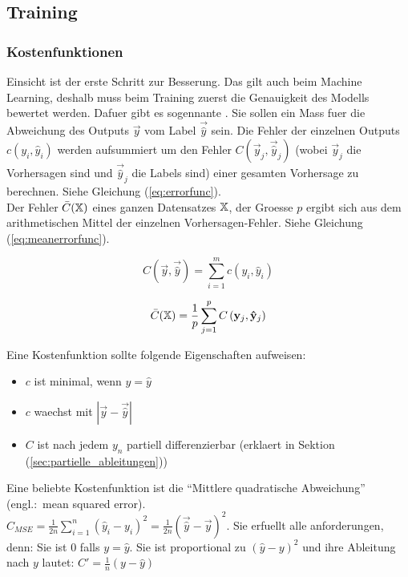 \documentclass[../main]{subfiles}
\begin{document}
\subsection{Training}
\subsubsection{Kostenfunktionen}
Einsicht ist der erste Schritt zur Besserung. Das gilt auch beim Machine Learning, deshalb muss beim Training zuerst die Genauigkeit des Modells bewertet werden.
Dafuer gibt es sogennante . Sie sollen ein Mass fuer die Abweichung des Outputs $\vec{y}$ vom Label $\vec{\hat{y}}$ sein.
\para{}
Die Fehler der einzelnen Outputs $c(y_i,\hat{y}_i)$ werden aufsummiert um den
Fehler $C(\vec{y}_j,\vec{\hat{y}}_j)$ (wobei $\vec{y}_j$ die Vorhersagen sind und
$\vec{\hat{y}}_j$ die Labels sind) einer gesamten Vorhersage zu berechnen. Siehe Gleichung (\ref{eq:errorfunc}).\\
Der Fehler $\bar{C}(\mathbb{X})$ eines ganzen Datensatzes $\mathbb{X}$, der
Groesse $p$ ergibt sich aus dem arithmetischen
Mittel der einzelnen Vorhersagen-Fehler. Siehe Gleichung (\ref{eq:meanerrorfunc}).
\para{}
\begin{minipage}[h!]{0.5\textwidth}
  \centering
  \begin{equation}\label{eq:errorfunc}
    C \left(\vec{y},\vec{\hat{y}} \right)=\displaystyle\sum_{i=1}^{m} c(y_i, \hat{y}_i)
  \end{equation}
\end{minipage}
\begin{minipage}[h!]{0.5\textwidth}
  \centering
  \begin{equation}\label{eq:meanerrorfunc}
    \bar{C}(\mathbb{X}) = \frac{1}{p}\displaystyle\sum_{j=1}^{p} C\left(\mathbf{y}_j,\mathbf{\hat{y}}_j\right)
  \end{equation}
\end{minipage}
\para{}
Eine Kostenfunktion sollte folgende Eigenschaften aufweisen:
\begin{itemize}
\item{$c$ ist minimal, wenn $y = \hat{y}$}
\item{$c$ waechst mit $|\vec{y}-\vec{\hat{y}}|$}
\item{$C$ ist nach jedem $y_n$ partiell differenzierbar (erklaert in Sektion (\ref{sec:partielle_ableitungen}))}
\end{itemize}

Eine beliebte Kostenfunktion ist die ``Mittlere quadratische Abweichung'' (engl.:\ mean squared error).\\
$\displaystyle C_{MSE} = \frac{1}{2n}\sum_{i=1}^{n}{(\hat{y}_i - y_i)}^2 = \frac{1}{2n}{(\vec{\hat{y}} - \vec{y})}^2$.
Sie erfuellt alle anforderungen, denn:
Sie ist $0$ falls $y=\hat{y}$. Sie ist proportional zu ${(\hat{y}-y)}^2$ und ihre Ableitung nach $y$ lautet: $C'=\frac{1}{n}(y-\hat{y})$
\end{document}
